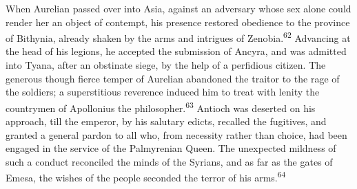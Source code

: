 
When Aurelian passed over into Asia, against an adversary whose
sex alone could render her an object of contempt, his presence
restored obedience to the province of Bithynia, already shaken by
the arms and intrigues of Zenobia.\textsuperscript{62} Advancing at the head of
his legions, he accepted the submission of Ancyra, and was
admitted into Tyana, after an obstinate siege, by the help of a
perfidious citizen. The generous though fierce temper of Aurelian
abandoned the traitor to the rage of the soldiers; a
superstitious reverence induced him to treat with lenity the
countrymen of Apollonius the philosopher.\textsuperscript{63} Antioch was deserted
on his approach, till the emperor, by his salutary edicts,
recalled the fugitives, and granted a general pardon to all who,
from necessity rather than choice, had been engaged in the
service of the Palmyrenian Queen. The unexpected mildness of such
a conduct reconciled the minds of the Syrians, and as far as the
gates of Emesa, the wishes of the people seconded the terror of
his arms.\textsuperscript{64}




